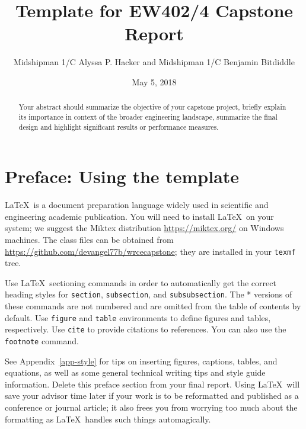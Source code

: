 \documentclass{wrcecapstone}
\title{Template for EW402/4 Capstone Report}
\author{Midshipman 1/C Alyssa P. Hacker and Midshipman 1/C Benjamin Bitdiddle}
\date{May 5, 2018} %
\begin{document}
\maketitlepage
\cleardoublepage
\tableofcontents

\clearpage
\maketitle
\begin{abstract}
Your abstract should summarize the objective of your capstone project, briefly explain its importance in context of the broader engineering landscape, summarize the final design and highlight significant results or performance measures.
\end{abstract}

\section*{Preface: Using the template}
\LaTeX\ is a document preparation language widely used in scientific and engineering academic publication.  You will need to install \LaTeX\ on your system; we suggest the Miktex distribution \url{https://miktex.org/} on Windows machines. The class files can be obtained from \url{https://github.com/devangel77b/wrcecapstone}; they are installed in your \lstinline{texmf} tree. 

Use \LaTeX\ sectioning commands in order to automatically get the correct heading styles for \lstinline{section}, \lstinline{subsection}, and \lstinline{subsubsection}. The * versions of these commands are not numbered and are omitted from the table of contents by default. Use \lstinline{figure} and \lstinline{table} environments to define figures and tables, respectively. Use \lstinline{cite} to provide citations to references. You can also use the \lstinline{footnote} command.  

See Appendix~\ref{app-style} for tips on inserting figures, captions, tables, and equations, as well as some general technical writing tips and style guide information.  Delete this preface section from your final report. Using \LaTeX\ will save your advisor time later if your work is to be reformatted and published as a conference or journal article; it also frees you from worrying too much about the formatting as \LaTeX\ handles such things automagically. 
\end{document}
